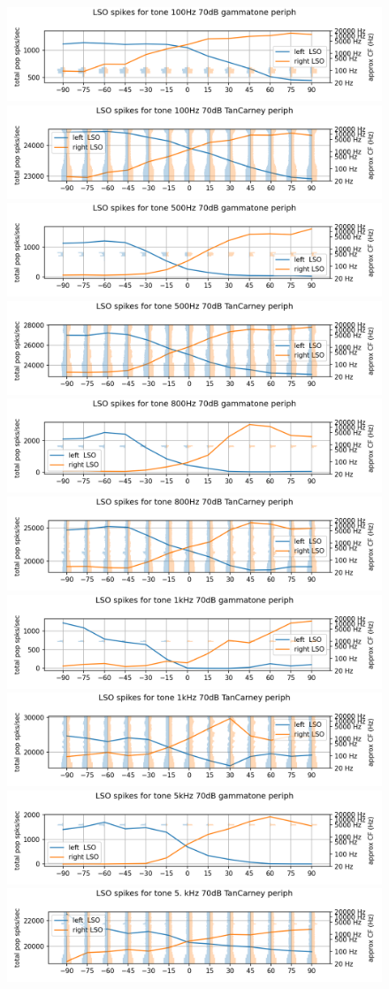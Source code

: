 \documentclass[11pt,a4paper]{article}
\begin{document}
\begin{figure}[H]
    \centering
    \includegraphics[width=0.4\linewidth]{Images/lso100.png}
    \includegraphics[width=0.4\linewidth]{Images/lso100tc.png}
    \includegraphics[width=0.4\linewidth]{Images/lso500.png}
    \includegraphics[width=0.4\linewidth]{Images/lso500tc.png}
    \includegraphics[width=0.4\linewidth]{Images/lso800.png}
    \includegraphics[width=0.4\linewidth]{Images/lso800tc.png}
    \includegraphics[width=0.4\linewidth]{Images/1khz.png}
    \includegraphics[width=0.4\linewidth]{Images/lso1000tc.png}
    \includegraphics[width=0.4\linewidth]{Images/lso5khz.png}
    \includegraphics[width=0.4\linewidth]{Images/lso5000tc.png}

\end{figure}
\end{document}
